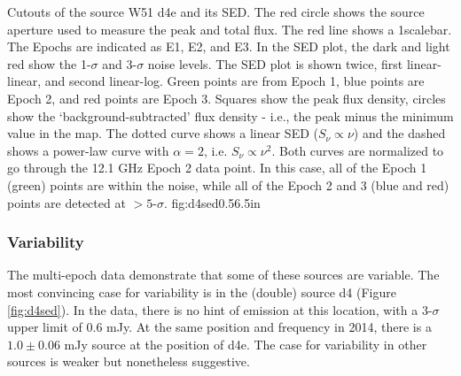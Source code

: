 {Cutouts of the source W51 d4e and its SED.
The red circle shows the source aperture used to measure the peak and total
flux.  The red line shows a 1\arcsec scalebar.  The Epochs are indicated as E1,
E2, and E3.
In the SED plot, the dark and light red show the 1-$\sigma$ and 3-$\sigma$
noise levels.  The SED plot is shown twice, first linear-linear, and second
linear-log.
Green points are from Epoch 1, blue points are Epoch 2, and red points are
Epoch 3.  Squares show the peak flux density, circles show the
`background-subtracted' flux density - i.e., the peak minus the minimum value
in the map.
The dotted curve shows a linear SED ($S_\nu \propto \nu$) and the dashed shows
a power-law curve with $\alpha=2$, i.e. $S_\nu \propto \nu^2$.  Both curves are
normalized to go through the 12.1 GHz Epoch 2 data point.  In this case, all of
the Epoch 1 (green) points are within the noise, while all of the Epoch 2 and 3
(blue and red) points are detected at $>5$-$\sigma$.
}
{fig:d4sed}{0.5}{6.5in}

\subsubsection{Variability}
\label{sec:variability}
The multi-epoch data demonstrate that some of these sources are variable.  The
most convincing case for variability is in the (double) source d4 (Figure
\ref{fig:d4sed}).  In the \citet{Mehringer1994a} data, there is no hint of
emission at this location, with a 3-$\sigma$ upper limit of 0.6 mJy.  At the
same position and frequency in 2014, there is a $1.0 \pm 0.06$ mJy source at
the position of d4e.  The case for variability in other sources is weaker but
nonetheless suggestive.



